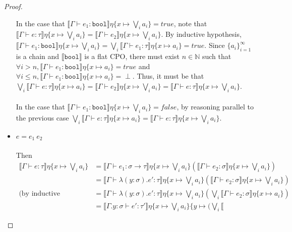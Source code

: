\begin{proof}
\begin{itemize}
%
In the case that $\llbracket \Gamma \vdash e_1 : \texttt{bool} \rrbracket\eta\{x\mapsto  \bigvee_i a_i\} = true$, 
note that $\llbracket \Gamma \vdash e : 
\tau \rrbracket\eta\{x\mapsto  \bigvee_i a_i\} =  \llbracket \Gamma \vdash e_2 \rrbracket\eta\{x\mapsto  \bigvee_i a_i\}$. 
By inductive hypothesis, 
$\llbracket \Gamma \vdash e_1 : \texttt{bool} \rrbracket\eta\{x\mapsto  \bigvee_i a_i\} = 
\bigvee_i\llbracket \Gamma \vdash e_1 : \tau \rrbracket\eta\{x\mapsto a_i\} = true$. 
Since $\{a_i\}^{\infty}_{i=1}$ is a chain 
and $\llbracket\texttt{bool}\rrbracket$ is a flat CPO, there must exist $n \in \mathbb{N}$ such that 
$\forall i > n, \llbracket \Gamma \vdash e_1 : \texttt{bool}
\rrbracket\eta\{x\mapsto a_i\} = true$ and 
$\forall i \leq n, \llbracket \Gamma \vdash e_1 : \texttt{bool}\rrbracket\eta\{x\mapsto  a_i\} = \perp$. Thus, it must 
be that $\bigvee_i \llbracket \Gamma \vdash e : \tau \rrbracket\eta\{x\mapsto a_i\} = 
\llbracket \Gamma \vdash e_2 \rrbracket\eta\{x\mapsto  \bigvee_i a_i\} = 
\llbracket \Gamma \vdash e : \tau \rrbracket\eta\{x\mapsto  \bigvee_i a_i\}$. \\ \\
%
In the case that $\llbracket \Gamma \vdash e_1 : \texttt{bool} \rrbracket\eta\{x\mapsto  \bigvee_i a_i\} = false$, by reasoning parallel to the previous case $\bigvee_i \llbracket \Gamma \vdash e : \tau \rrbracket\eta\{x\mapsto a_i\}  = 
\llbracket \Gamma \vdash e : \tau \rrbracket\eta\{x\mapsto  \bigvee_i a_i\}$.
 \item $ e = e_1 \ e_2$ \\ \\
Then
\begin{align*}
\llbracket \Gamma \vdash e : \tau \rrbracket\eta\{x \mapsto \bigvee_i a_i\} &=
\llbracket \Gamma \vdash e_1 : \sigma \rightarrow \tau \rrbracket\eta\{x \mapsto \bigvee_i a_i\}
(\llbracket \Gamma \vdash e_2 : \sigma \rrbracket\eta\{x \mapsto \bigvee_i a_i\}) \\
&= \llbracket \Gamma \vdash \lambda (y:\sigma).e' : \tau \rrbracket\eta\{x \mapsto \bigvee_i a_i\}
(\llbracket \Gamma \vdash e_2 : \sigma \rrbracket\eta\{x \mapsto \bigvee_i a_i\}) \\
\text{(by inductive hypothesis)} &= 
\llbracket \Gamma \vdash \lambda (y:\sigma).e' : \tau \rrbracket\eta\{x \mapsto \bigvee_i a_i\}
(\bigvee_i \llbracket \Gamma \vdash e_2 : \sigma \rrbracket\eta\{x \mapsto a_i\}) \\
&= \llbracket \Gamma. y : \sigma \vdash e' : \tau' \rrbracket\eta\{x \mapsto \bigvee_i a_i\}\{y \mapsto (\bigvee_i \llbracket 

\end{align*}
\end{itemize}
\end{proof}
